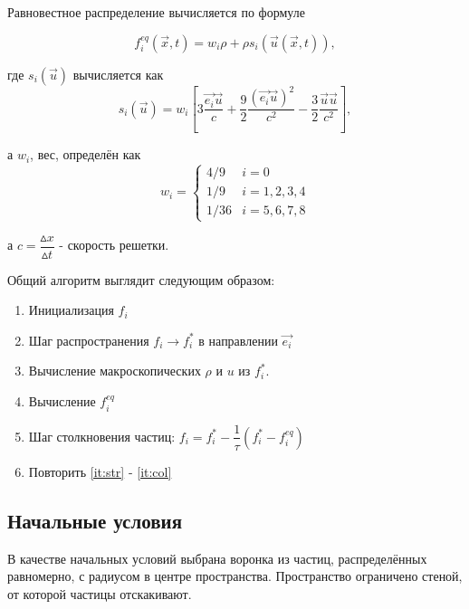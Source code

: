 			Равновестное распределение вычисляется по формуле 
			
			\[ f_i^{eq}(\vec{x}, t) = w_i\rho+\rho s_i(\vec{u}(\vec{x},t)) ,\]
			
			где $ s_i(\vec{u}) $ вычисляется как
			\[ s_i(\vec{u}) =w_i[3 \dfrac{\vec{e_i} \vec{u}}{c} + \frac{9}{2}\dfrac{(\vec{e_i} \vec{u})^2}{c^2} - \frac{3}{2} \dfrac{\vec{u} \vec{u}}{c^2}],\]
			
			а $ w_i $, вес, определён как
						\begin{equation*}
			w_i = 
			\begin{cases}
			4/9 &i = 0\\
			1/9 & i = 1, 2, 3, 4\\
			1/36 & i = 5, 6, 7, 8
			\end{cases}
			\end{equation*}
			
			а $ c = \dfrac{\vartriangle x}{\vartriangle t} $ - скорость решетки.
			
			Общий алгоритм выглядит следующим образом:
			\begin{enumerate}
				\item Инициализация $ f_i $
				\item Шаг распространения $ f_i \rightarrow f_i^*$ в направлении $ \vec{e_i} $ \label{it:str}
				\item Вычисление макроскопических $ \rho $ и $ u $ из $ f_i^* $.
				\item Вычисление $ f_i^{eq} $
				\item Шаг столкновения частиц: $ f_i=f_i^*-\dfrac{1}{\tau}(f_i^* - f_i^{eq}) $ \label{it:col}
				\item Повторить \ref{it:str} - \ref{it:col}
			\end{enumerate}
			
		\subsection{Начальные условия}
		В качестве начальных условий выбрана воронка из частиц, распределённых равномерно, с радиусом в центре пространства.		Пространство ограничено стеной, от которой частицы отскакивают.	
		
